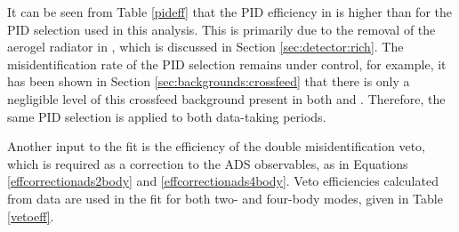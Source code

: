 \begin{table}[h]
\centering
{}
\caption{Summary of the PID efficiencies used in the \CP fit.}
\label{pideff}
\end{table}

It can be seen from Table \ref{pideff} that the PID efficiency in \runtwo is higher than \runone for the PID selection used in this analysis. This is primarily due to the removal of the aerogel radiator in \runtwo, which is discussed in Section \ref{sec:detector:rich}. The misidentification rate of the PID selection remains under control, for example, it has been shown in Section \ref{sec:backgrounds:crossfeed} that there is only a negligible level of this crossfeed background present in both \runone and \runtwo. Therefore, the same PID selection is applied to both data-taking periods.

Another input to the fit is the efficiency of the double misidentification veto, which is required as a correction to the ADS observables, as in Equations \ref{effcorrectionads2body} and \ref{effcorrectionads4body}. Veto efficiencies calculated from data are used in the \CP fit for both two- and four-body modes, given in Table \ref{vetoeff}.

\begin{table}[h]
\centering
{}
\caption{Summary of the veto efficiencies used in the \CP fit.}
\label{vetoeff}
\end{table}

